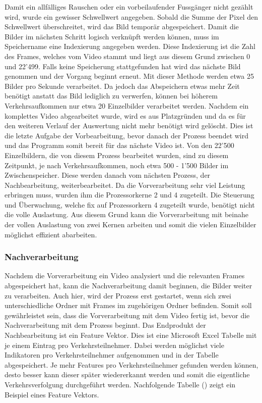 Damit ein allfälliges Rauschen oder ein vorbeilaufender Fussgänger nicht gezählt wird, wurde ein gewisser Schwellwert angegeben. Sobald die Summe der Pixel den Schwellwert überschreitet, wird das Bild temporär abgespeichert. Damit die Bilder im nächsten Schritt logisch verknüpft werden können, muss im Speichername eine Indexierung angegeben werden. Diese Indexierung ist die Zahl des Frames, welches vom Video stammt und liegt aus diesem Grund zwischen 0 und 22'499. Falls keine Speicherung stattgefunden hat wird das nächste Bild genommen und der Vorgang beginnt erneut. Mit dieser Methode werden etwa 25 Bilder pro Sekunde verarbeitet. Da jedoch das Abspeichern etwas mehr Zeit benötigt anstatt das Bild lediglich zu verwerfen, können bei höherem Verkehrsaufkommen nur etwa 20 Einzelbilder verarbeitet werden. Nachdem ein komplettes Video abgearbeitet wurde, wird es aus Platzgründen und da es für den weiteren Verlauf der Auswertung nicht mehr benötigt wird gelöscht. Dies ist die letzte Aufgabe der Vorbearbeitung, bevor danach der Prozess beendet wird und das Programm somit bereit für das nächste Video ist. Von den 22'500 Einzelbildern, die von diesem Prozess bearbeitet wurden, sind zu diesem Zeitpunkt, je nach Verkehrsaufkommen, noch etwa 500 - 1'500 Bilder im Zwischenspeicher. Diese werden danach vom nächsten Prozess, der Nachbearbeitung, weiterbearbeitet. Da die Vorverarbeitung sehr viel Leistung erbringen muss, wurden ihm die Prozessorkerne 2 und 4 zugeteilt. Die Steuerung und Überwachung, welche fix auf Prozessorkern 4 zugeteilt wurde, benötigt nicht die volle Auslastung. Aus diesem Grund kann die Vorverarbeitung mit beinahe der vollen Auslastung von zwei Kernen arbeiten und somit die vielen Einzelbilder möglichst effizient abarbeiten.

\subsubsection{Nachverarbeitung}
Nachdem die Vorverarbeitung ein Video analysiert und die relevanten Frames abgespeichert hat, kann die Nachverarbeitung damit beginnen, die Bilder weiter zu verarbeiten. Auch hier, wird der Prozess erst gestartet, wenn sich zwei unterschiedliche Ordner mit Frames im zugehörigen Ordner befinden. Somit soll gewährleistet sein, dass die Vorverarbeitung mit dem Video fertig ist, bevor die Nachverarbeitung mit dem Prozess beginnt. Das Endprodukt der Nachbearbeitung ist ein Feature Vektor. Dies ist eine Microsoft Excel Tabelle mit je einem Eintrag pro Verkehrsteilnehmer. Dabei werden möglichst viele Indikatoren pro Verkehrsteilnehmer aufgenommen und in der Tabelle abgespeichert. Je mehr Features pro Verkehrsteilnehmer gefunden werden können, desto besser kann dieser später wiedererkannt werden und somit die eigentliche Verkehrsverfolgung durchgeführt werden. Nachfolgende Tabelle () zeigt ein Beispiel eines Feature Vektors.


